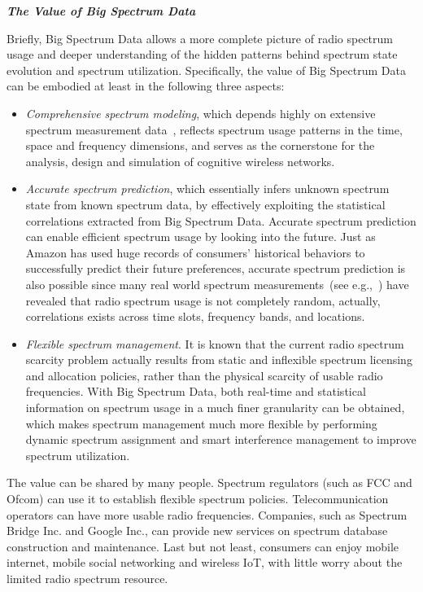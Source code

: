 \documentclass[12pt,draftcls,journal,letterpaper,oneside,onecolumn]{IEEEtran}
\begin{document}
\textbf{\emph{The Value of Big Spectrum Data}}

Briefly, Big Spectrum Data allows a more complete picture of radio spectrum usage and deeper understanding of the hidden patterns behind spectrum state evolution and spectrum utilization. Specifically, the value of Big Spectrum Data can be embodied at least in the following three aspects:
\begin{itemize}
  \item \emph{Comprehensive spectrum modeling}, which depends highly on extensive spectrum measurement data~\cite{Spectrum_models}, reflects spectrum usage patterns in the time, space and frequency dimensions, and serves as the cornerstone for the analysis, design and simulation of cognitive wireless networks.
  \item \emph{Accurate spectrum prediction}, which essentially infers unknown spectrum state from known spectrum data, by effectively exploiting the statistical correlations extracted from Big Spectrum Data. Accurate spectrum prediction can enable efficient spectrum usage by looking into the future. Just as Amazon has used huge records of consumers' historical behaviors to successfully predict their future preferences, accurate spectrum prediction is also possible since many real world spectrum measurements~(see e.g.,~\cite{Spectrum_prediction}) have revealed that radio spectrum usage is not completely random, actually, correlations exists across time slots, frequency bands, and locations.
  \item \emph{Flexible spectrum management}. It is known that the current radio spectrum scarcity problem actually results from static and inflexible spectrum licensing and allocation policies, rather than the physical scarcity of usable radio frequencies. With Big Spectrum Data, both real-time and statistical information on spectrum usage in a much finer granularity can be obtained, which makes spectrum management much more flexible by performing dynamic spectrum assignment and smart interference management to improve spectrum utilization.
\end{itemize}

The value can be shared by many people. Spectrum regulators (such as FCC and Ofcom) can use it to establish flexible spectrum policies. Telecommunication operators can have more usable radio frequencies. Companies, such as Spectrum Bridge Inc. and Google Inc., can provide new services on spectrum database construction and maintenance. Last but not least, consumers can enjoy mobile internet, mobile social networking and wireless IoT, with little worry about the limited radio spectrum resource.
\\
\end{document}
